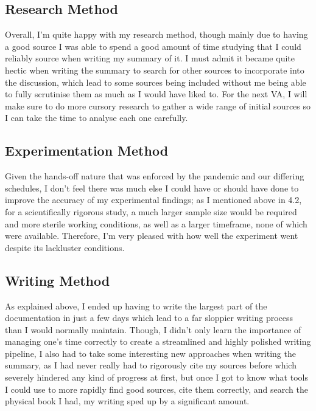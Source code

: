 \documentclass[a4paper,10pt]{article}
\begin{document}
\subsection{Research Method}
Overall, I'm quite happy with my research method, though mainly due to having a good source I was able
to spend a good amount of time studying that I could reliably source when writing my summary of it.
I must admit it became quite hectic when writing the summary to search for other sources to incorporate
into the discussion, which lead to some sources being included without me being able to fully scrutinise
them as much as I would have liked to. For the next VA, I will make sure to do more cursory research to
gather a wide range of initial sources so I can take the time to analyse each one carefully.

\subsection{Experimentation Method}
Given the hands-off nature that was enforced by the pandemic and our differing schedules, I don't feel
there was much else I could have or should have done to improve the accuracy of my experimental findings;
as I mentioned above in 4.2, for a scientifically rigorous study, a much larger sample size would be
required and more sterile working conditions, as well as a larger timeframe, none of which were available.
Therefore, I'm very pleased with how well the experiment went despite its lackluster conditions.

\subsection{Writing Method}
As explained above, I ended up having to write the largest part of the documentation in just a few days
which lead to a far sloppier writing process than I would normally maintain. Though, I didn't only learn
the importance of managing one's time correctly to create a streamlined and highly polished writing
pipeline, I also had to take some interesting new approaches when writing the summary, as I had never
really had to rigorously cite my sources before which severely hindered any kind of progress at first,
but once I got to know what tools I could use to more rapidly find good sources, cite them correctly,
and search the physical book I had, my writing sped up by a significant amount.
\end{document}
